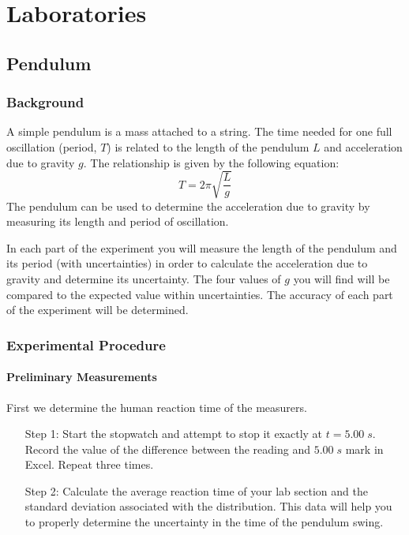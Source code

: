 \documentclass[12pt, a4paper, oneside, openright, titlepage]{book}
\begin{document}
\tableofcontents


\part{Laboratories}

\chapter{Pendulum}

\section{Background}

A simple pendulum is a mass attached to a string. The time needed for one full oscillation (period, $T$) is related to the length of the pendulum $L$ and acceleration due to gravity $g$. The relationship is given by the following equation: \begin{equation}\label{eq:Pend1}
    T = 2\pi \sqrt{\frac{L}{g}}
\end{equation}
The pendulum can be used to determine the acceleration due to gravity by measuring its length and period of oscillation.

In each part of the experiment you will measure the length of the pendulum and its period (with uncertainties) in order to calculate the acceleration due to gravity and determine its uncertainty. The four values of $g$ you will find will be compared to the expected value within uncertainties. The accuracy of each part of the experiment will be determined.

\section{Experimental Procedure}

\subsection{Preliminary Measurements}

First we determine the human reaction time of the measurers. \begin{itemize}[leftmargin = 50pt]
    \item[Step 1:] Start the stopwatch and attempt to stop it exactly at $t = 5.00\;s$. Record the value of the difference between the reading and $5.00\;s$ mark in Excel. Repeat three times.
    \item[Step 2:] Calculate the average reaction time of your lab section and the standard deviation associated with the distribution. This data will help you to properly determine the uncertainty in the time of the pendulum swing.
\end{itemize}
\end{document}
